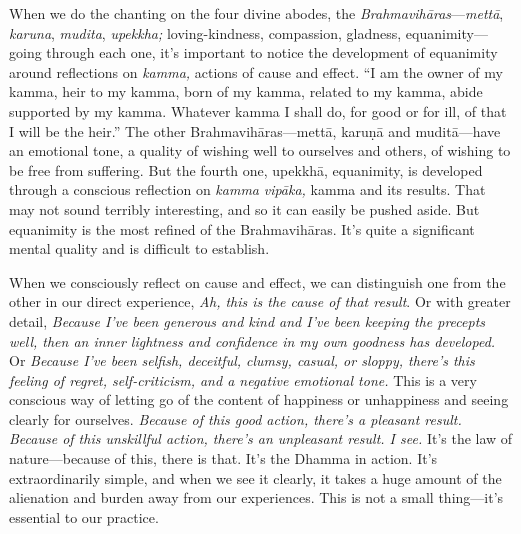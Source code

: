 
When we do the chanting on the four divine abodes, the 
\emph{Brahmavihāras}---\emph{mettā}, \emph{karuna}, \emph{mudita}, 
\emph{upekkha;} loving-kindness, compassion, gladness, 
equanimity---going through each one, it's important to notice the 
development of equanimity around reflections on \emph{kamma,} actions 
of cause and effect. ``I am the owner of my kamma, heir to my kamma, 
born of my kamma, related to my kamma, abide supported by my kamma. 
Whatever kamma I shall do, for good or for ill, of that I will be the 
heir.'' The other Brahmavihāras---mettā, karuṇā and muditā---have 
an emotional tone, a quality of wishing well to ourselves and others, 
of wishing to be free from suffering. But the fourth one, upekkhā, 
equanimity, is developed through a conscious reflection on \emph{kamma} 
\emph{vipāka,} kamma and its results. That may not sound terribly 
interesting, and so it can easily be pushed aside. But equanimity is 
the most refined of the Brahmavihāras. It's quite a significant mental 
quality and is difficult to establish.

When we consciously reflect on cause and effect, we can distinguish one 
from the other in our direct experience, \emph{Ah, this is the cause of 
that result}. Or with greater detail, \emph{Because I've been generous 
and kind and I've been keeping the precepts well, then an inner 
lightness and confidence in my own goodness has developed.} Or 
\emph{Because I've been selfish, deceitful, clumsy, casual, or sloppy, 
there's this feeling of regret, self-criticism, and a negative 
emotional tone.} This is a very conscious way of letting go of the 
content of happiness or unhappiness and seeing clearly for ourselves. 
\emph{Because of this good action, there's a pleasant result. Because 
of this unskillful action, there's an unpleasant result. I see.} It's 
the law of nature---because of this, there is that. It's the Dhamma in 
action. It's extraordinarily simple, and when we see it clearly, it 
takes a huge amount of the alienation and burden away from our 
experiences. This is not a small thing---it's essential to our practice.

